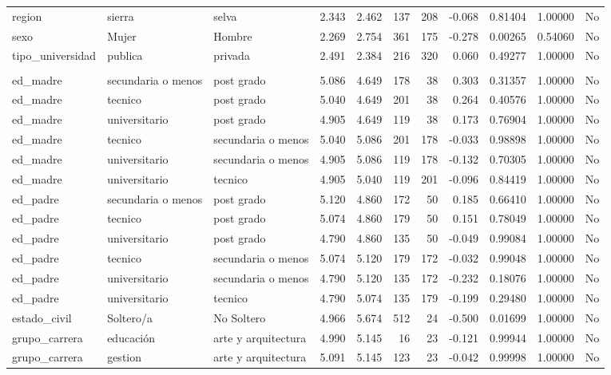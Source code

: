 \documentclass[
  letterpaper,
  DIV=11,
  numbers=noendperiod]{scrartcl}
\begin{document}
\begin{table}
\begin{tabular*}{\linewidth}{@{\extracolsep{\fill}}lllrrrrrrrl}
region & sierra & selva & 2.343 & 2.462 & 137 & 208 & -0.068 & 0.81404 & 1.00000 & No \\ 
sexo & Mujer & Hombre & 2.269 & 2.754 & 361 & 175 & -0.278 & 0.00265 & 0.54060 & No \\ 
tipo\_universidad & publica & privada & 2.491 & 2.384 & 216 & 320 & 0.060 & 0.49277 & 1.00000 & No \\ 
\midrule\addlinespace[2.5pt]
\multicolumn{11}{l}{habilidades\_sociales} \\[2.5pt] 
\midrule\addlinespace[2.5pt]
ed\_madre & secundaria o menos & post grado & 5.086 & 4.649 & 178 & 38 & 0.303 & 0.31357 & 1.00000 & No \\ 
ed\_madre & tecnico & post grado & 5.040 & 4.649 & 201 & 38 & 0.264 & 0.40576 & 1.00000 & No \\ 
ed\_madre & universitario & post grado & 4.905 & 4.649 & 119 & 38 & 0.173 & 0.76904 & 1.00000 & No \\ 
ed\_madre & tecnico & secundaria o menos & 5.040 & 5.086 & 201 & 178 & -0.033 & 0.98898 & 1.00000 & No \\ 
ed\_madre & universitario & secundaria o menos & 4.905 & 5.086 & 119 & 178 & -0.132 & 0.70305 & 1.00000 & No \\ 
ed\_madre & universitario & tecnico & 4.905 & 5.040 & 119 & 201 & -0.096 & 0.84419 & 1.00000 & No \\ 
ed\_padre & secundaria o menos & post grado & 5.120 & 4.860 & 172 & 50 & 0.185 & 0.66410 & 1.00000 & No \\ 
ed\_padre & tecnico & post grado & 5.074 & 4.860 & 179 & 50 & 0.151 & 0.78049 & 1.00000 & No \\ 
ed\_padre & universitario & post grado & 4.790 & 4.860 & 135 & 50 & -0.049 & 0.99084 & 1.00000 & No \\ 
ed\_padre & tecnico & secundaria o menos & 5.074 & 5.120 & 179 & 172 & -0.032 & 0.99048 & 1.00000 & No \\ 
ed\_padre & universitario & secundaria o menos & 4.790 & 5.120 & 135 & 172 & -0.232 & 0.18076 & 1.00000 & No \\ 
ed\_padre & universitario & tecnico & 4.790 & 5.074 & 135 & 179 & -0.199 & 0.29480 & 1.00000 & No \\ 
estado\_civil & Soltero/a & No Soltero & 4.966 & 5.674 & 512 & 24 & -0.500 & 0.01699 & 1.00000 & No \\ 
grupo\_carrera & educación & arte y arquitectura & 4.990 & 5.145 & 16 & 23 & -0.121 & 0.99944 & 1.00000 & No \\ 
grupo\_carrera & gestion & arte y arquitectura & 5.091 & 5.145 & 123 & 23 & -0.042 & 0.99998 & 1.00000 & No \\ 

\end{tabular*}
\end{table}
\end{document}
